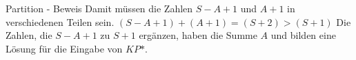 \documentclass[12pt,handout,notes=dontshow,xcolor=table]{beamer}
\begin{document}
\begin{frame}{Partition - Beweis}
Damit müssen die Zahlen \(S - A + 1\) und \(A + 1\) in verschiedenen Teilen sein.
\((S - A + 1) + (A + 1) = (S + 2) > (S + 1)\)
Die Zahlen, die \(S - A + 1\) zu \(S + 1\) ergänzen, haben die Summe \(A\) und bilden eine Lösung für die Eingabe von \(KP\mbox{*}\).
\end{frame}

%



%


%
\end{document}
